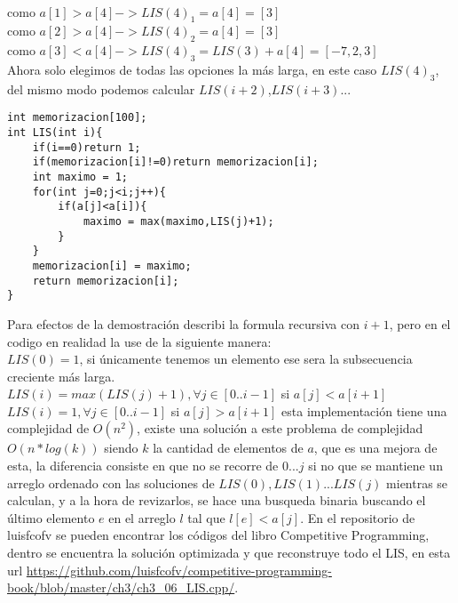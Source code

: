 \\como $a[1] > a[4] -> LIS(4)_1 = a[4] = [3]$
\\como $a[2] > a[4] -> LIS(4)_2 = a[4] = [3]$
\\como $a[3] < a[4] -> LIS(4)_3 = LIS(3) + a[4] = [-7,2,3]$
\\Ahora solo elegimos de todas las opciones la más larga, en este caso $LIS(4)_3$, del mismo modo podemos calcular $LIS(i+2)$,$LIS(i+3)$...
\\\begin{minipage}{\textwidth}
\begin{lstlisting}[style=C,caption=LIS.cpp]
int memorizacion[100];
int LIS(int i){
    if(i==0)return 1;
    if(memorizacion[i]!=0)return memorizacion[i];
    int maximo = 1;
    for(int j=0;j<i;j++){
        if(a[j]<a[i]){
            maximo = max(maximo,LIS(j)+1);
        }
    }
    memorizacion[i] = maximo;
    return memorizacion[i];
}
\end{lstlisting}
\end{minipage}
Para efectos de la demostración describi la formula recursiva con $i+1$, pero en el codigo en realidad la use de la siguiente manera:
\\$LIS(0) = 1$, si únicamente tenemos un elemento ese sera la subsecuencia creciente más larga.
\\$LIS(i) = max(LIS(j)+1), \forall j \in [0..i-1]$ si $a[j]<a[i+1]$
\\$LIS(i) = 1, \forall j \in [0..i-1]$ si $a[j]>a[i+1]$
esta implementación tiene una complejidad de $O(n^2)$, existe una solución a este problema de complejidad $O(n*log(k))$ siendo $k$ la cantidad de elementos de $a$, que es una mejora de esta, la diferencia consiste en que no se recorre de $0...j$ si no que se mantiene un arreglo ordenado con las soluciones de $LIS(0),LIS(1)...LIS(j)$ mientras se calculan, y a la hora de revizarlos, se hace una busqueda binaria buscando el último elemento $e$ en el arreglo $l$ tal que $l[e] < a[j]$. En el repositorio de luisfcofv se pueden encontrar los códigos del libro Competitive Programming, dentro se encuentra la solución optimizada y que reconstruye todo el LIS, en esta url \url{https://github.com/luisfcofv/competitive-programming-book/blob/master/ch3/ch3_06_LIS.cpp/}.
